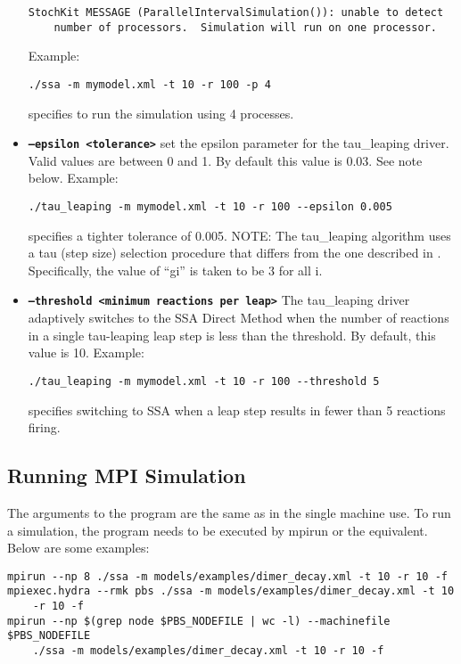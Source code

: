 \documentclass[11pt,letterpaper]{article}
\begin{document}
\begin{itemize}
\begin{lstlisting}
StochKit MESSAGE (ParallelIntervalSimulation()): unable to detect 
    number of processors.  Simulation will run on one processor.
\end{lstlisting}
Example: 
\begin{lstlisting}
./ssa -m mymodel.xml -t 10 -r 100 -p 4
\end{lstlisting}
specifies to run the simulation using 4 processes.
\item \texttt{\textbf{--epsilon <tolerance>}} set the epsilon parameter for the tau\_leaping driver.  Valid values are between 0 and 1.  By default this value is 0.03.  See note below.
Example: 
\begin{lstlisting}
./tau_leaping -m mymodel.xml -t 10 -r 100 --epsilon 0.005
\end{lstlisting}
specifies a tighter tolerance of 0.005.
NOTE: The tau\_leaping algorithm uses a tau (step size) selection procedure that differs from the one described in \cite{Cao2004}.  Specifically, the value of ``gi'' is taken to be 3 for all i.
\item \texttt{\textbf{--threshold <minimum reactions per leap>}}  The tau\_leaping driver adaptively switches to the SSA Direct Method when the number of reactions in a single tau-leaping leap step is less than the threshold.  By default, this value is 10.
Example: 
\begin{lstlisting}
./tau_leaping -m mymodel.xml -t 10 -r 100 --threshold 5
\end{lstlisting}
specifies switching to SSA when a leap step results in fewer than 5 reactions firing.
\end{itemize}

\subsection{Running MPI Simulation}
The arguments to the program are the same as in the single machine use. To run a simulation, the program needs to be executed by mpirun or the equivalent. Below are some examples:

\begin{lstlisting}
mpirun --np 8 ./ssa -m models/examples/dimer_decay.xml -t 10 -r 10 -f
mpiexec.hydra --rmk pbs ./ssa -m models/examples/dimer_decay.xml -t 10 
    -r 10 -f
mpirun --np $(grep node $PBS_NODEFILE | wc -l) --machinefile $PBS_NODEFILE 
    ./ssa -m models/examples/dimer_decay.xml -t 10 -r 10 -f
\end{lstlisting}
\end{document}
